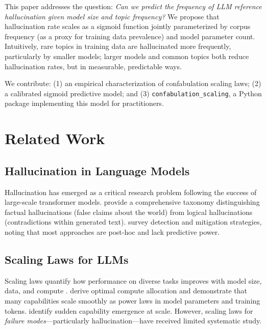 \documentclass[11pt,a4paper]{article}
\begin{document}
This paper addresses the question: \textit{Can we predict the frequency of LLM reference hallucination given model size and topic frequency?} We propose that hallucination rate scales as a sigmoid function jointly parameterized by corpus frequency (as a proxy for training data prevalence) and model parameter count. Intuitively, rare topics in training data are hallucinated more frequently, particularly by smaller models; larger models and common topics both reduce hallucination rates, but in measurable, predictable ways.

We contribute: (1) an empirical characterization of confabulation scaling laws; (2) a calibrated sigmoid predictive model; and (3) \texttt{confabulation\_scaling}, a Python package implementing this model for practitioners.

\section{Related Work}

\subsection{Hallucination in Language Models}

Hallucination has emerged as a critical research problem following the success of large-scale transformer models. \citet{Ji2023Hallucination} provide a comprehensive taxonomy distinguishing factual hallucinations (false claims about the world) from logical hallucinations (contradictions within generated text). \citet{Zhang2023SurveyHallucination} survey detection and mitigation strategies, noting that most approaches are post-hoc and lack predictive power.

\subsection{Scaling Laws for LLMs}

Scaling laws quantify how performance on diverse tasks improves with model size, data, and compute \citep{Kaplan2020ScalingLaws}. \citet{Hoffmann2022TrainingComputeOptimalLLMs} derive optimal compute allocation and demonstrate that many capabilities scale smoothly as power laws in model parameters and training tokens. \citet{Wei2022EmergentAbilities} identify sudden capability emergence at scale. However, scaling laws for \textit{failure modes}---particularly hallucination---have received limited systematic study.
\end{document}
